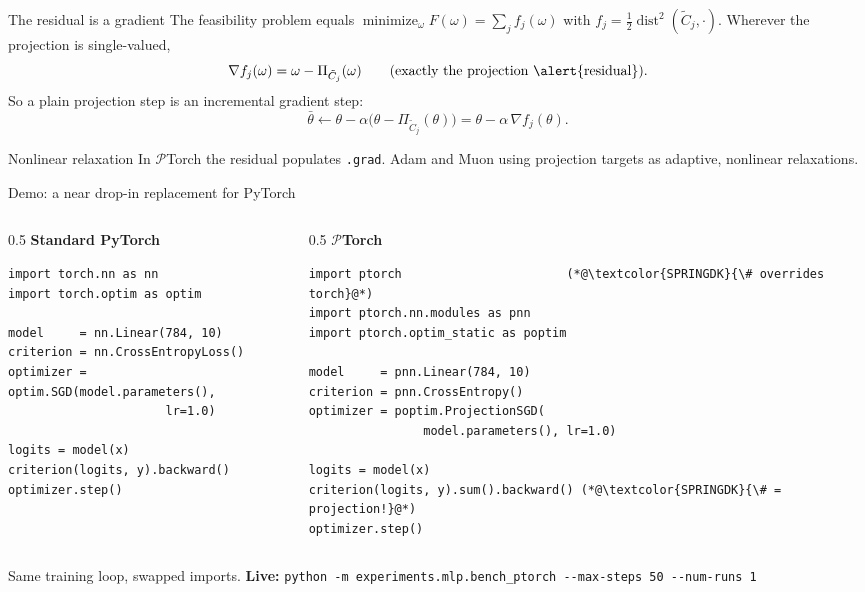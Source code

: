 \documentclass[aspectratio=169,10pt]{beamer}
\DeclareMathOperator*{\minimize}{minimize}
\newcommand{\dist}{\operatorname{dist}}
\newcommand{\PT}{\ensuremath{\mathcal{P}}Torch}
\begin{document}
\begin{frame}{The residual is a gradient}
  The feasibility problem equals $\minimize_\omega F(\omega)=\sum_j f_j(\omega)$
  with $f_j=\tfrac12\dist^2(\tilde C_j,\cdot)$. Wherever the projection is
  single-valued,
  \[
  \nabla f_j(\omega)=\omega-\Pi_{\tilde C_j}(\omega)
  \qquad(\text{exactly the projection \alert{residual}}).
  \]
  So a plain projection step is an \alert{incremental gradient step}:
  \[
  \bar\theta\gets\theta-\alpha\bigl(\theta-\Pi_{\tilde C_j}(\theta)\bigr)
  =\theta-\alpha\,\nabla f_j(\theta).
  \]
  \begin{block}{Nonlinear relaxation}
  In \PT{} the residual populates \texttt{.grad}. \alert{Adam and Muon }
  using projection targets as adaptive, nonlinear relaxations.
  \end{block}
\end{frame}

\begin{frame}[fragile]{Demo: a near drop-in replacement for PyTorch}
  \begin{columns}[T,onlytextwidth]
    \begin{column}{0.5\textwidth}
      \centering\textbf{Standard PyTorch}
      \begin{lstlisting}[style=py]
import torch.nn as nn
import torch.optim as optim

model     = nn.Linear(784, 10)
criterion = nn.CrossEntropyLoss()
optimizer = optim.SGD(model.parameters(),
                      lr=1.0)

logits = model(x)
criterion(logits, y).backward()
optimizer.step()
      \end{lstlisting}
    \end{column}
    \begin{column}{0.5\textwidth}
      \centering\textbf{\color{SPRINGDK}\PT}
      \begin{lstlisting}[style=py]
import ptorch                       (*@\textcolor{SPRINGDK}{\# overrides torch}@*)
import ptorch.nn.modules as pnn
import ptorch.optim_static as poptim

model     = pnn.Linear(784, 10)
criterion = pnn.CrossEntropy()
optimizer = poptim.ProjectionSGD(
                model.parameters(), lr=1.0)

logits = model(x)
criterion(logits, y).sum().backward() (*@\textcolor{SPRINGDK}{\# = projection!}@*)
optimizer.step()
      \end{lstlisting}
    \end{column}
  \end{columns}
  \vspace{-1em}
  \begin{center}\footnotesize
  Same training loop, swapped imports. \quad\textbf{Live:}\;
  \texttt{python -m experiments.mlp.bench\_ptorch -{}-max-steps 50 -{}-num-runs 1}
  \end{center}
\end{frame}
\end{document}
